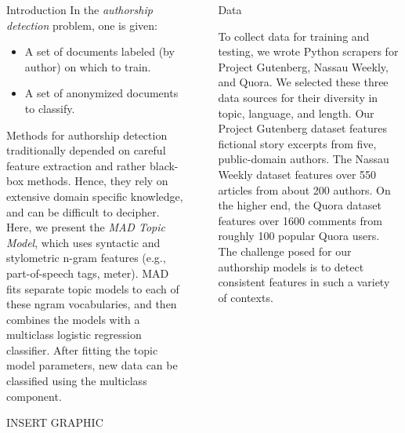 \documentclass[final]{beamer}
\newlength{\sepwid}
\newlength{\onecolwid}
\newlength{\twocolwid}
\begin{document}
\begin{frame}[t]
\begin{columns}[t]
\begin{column}{\onecolwid}
\begin{block}{Introduction}
In the \textit{authorship detection} problem, one is given:
\begin{itemize}
\item A set of documents labeled (by author) on which to train.
\item A set of anonymized documents to classify.
\end{itemize} Methods for authorship detection traditionally depended on careful feature extraction and rather black-box methods. Hence, they rely on extensive domain specific knowledge, and can be difficult to decipher. Here, we present the \textit{MAD Topic Model}, which uses  syntactic and stylometric n-gram features (e.g., part-of-speech tags, meter). MAD fits separate topic models to each of these ngram vocabularies, and then combines the models with a multiclass logistic regression classifier. After fitting the topic model parameters, new data can be classified using the multiclass component. 

INSERT GRAPHIC

\end{block}




\end{column} %

\begin{column}{\sepwid}\end{column} %

\begin{column}{\twocolwid} %

\begin{columns}[t,totalwidth=\twocolwid] %

\begin{column}{\onecolwid}\vspace{-.6in} %


\begin{block}{Data}

To collect data for training and testing, we wrote Python scrapers for Project Gutenberg, Nassau Weekly, and Quora. We selected these three data sources for their diversity in topic, language, and length. Our Project Gutenberg dataset features fictional story excerpts from five, public-domain authors. The Nassau Weekly dataset features over 550 articles from about 200 authors. On the higher end, the Quora dataset features over 1600 comments from roughly 100 popular Quora users. The challenge posed for our authorship models is to detect consistent features in such a variety of contexts.


\end{block}
\end{column}
\end{columns}
\end{column}
\end{columns}
\end{frame}
\end{document}
